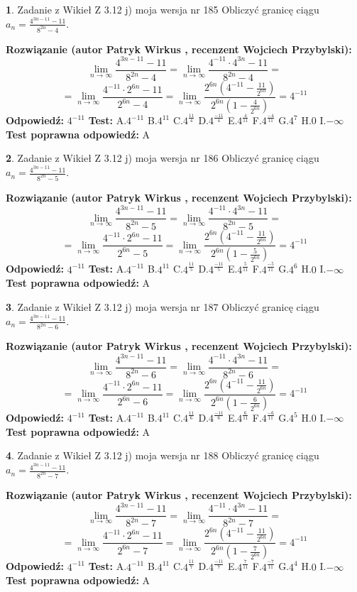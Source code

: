 \documentclass[12pt, a4paper]{article}
\theoremstyle{definition} %
\newtheorem{zad}{}
\newcommand{\zadStart}[1]{\begin{zad}#1\newline}
\newcommand{\zadStop}{\end{zad}}
\newcommand{\rozwStart}[2]{\noindent \textbf{Rozwiązanie (autor #1 , recenzent #2): }\newline}
\newcommand{\rozwStop}{\newline}
\newcommand{\odpStart}{\noindent \textbf{Odpowiedź:}\newline}
\newcommand{\odpStop}{\newline}
\newcommand{\testStart}{\noindent \textbf{Test:}\newline}
\newcommand{\testStop}{\newline}
\newcommand{\kluczStart}{\noindent \textbf{Test poprawna odpowiedź:}\newline}
\newcommand{\kluczStop}{\newline}
\begin{document}
\zadStart{Zadanie z Wikieł Z 3.12 j) moja wersja nr 185}
Obliczyć granicę ciągu $a_{n}=\frac{4^{3n-11}-11}{8^{2n}-4}$.
\zadStop
\rozwStart{Patryk Wirkus}{Wojciech Przybylski}
$$\lim\limits_{n\to\infty}\frac{4^{3n-11}-11}{8^{2n}-4}= \lim\limits_{n\to\infty}\frac{4^{-11} \cdot 4^{3n}-11}{8^{2n}-4}=$$
$$= \lim\limits_{n\to\infty}\frac{4^{-11} \cdot 2^{6n}-11}{2^{6n}-4}= \lim\limits_{n\to\infty}\frac{2^{6n}(4^{-11} - \frac{11}{2^{6n}})}{2^{6n}(1-\frac{4}{2^{6n}})}= 4^{-11}$$
\rozwStop
\odpStart
$4^{-11}$
\odpStop
\testStart
A.$4^{-11}$
B.$4^{11}$
C.$4^{\frac{11}{4}}$
D.$4^{\frac{-11}{4}}$
E.$4^{\frac{4}{11}}$
F.$4^{\frac{-4}{11}}$
G.$4^{7}$
H.$0$
I.$-\infty$
\testStop
\kluczStart
A
\kluczStop



\zadStart{Zadanie z Wikieł Z 3.12 j) moja wersja nr 186}
Obliczyć granicę ciągu $a_{n}=\frac{4^{3n-11}-11}{8^{2n}-5}$.
\zadStop
\rozwStart{Patryk Wirkus}{Wojciech Przybylski}
$$\lim\limits_{n\to\infty}\frac{4^{3n-11}-11}{8^{2n}-5}= \lim\limits_{n\to\infty}\frac{4^{-11} \cdot 4^{3n}-11}{8^{2n}-5}=$$
$$= \lim\limits_{n\to\infty}\frac{4^{-11} \cdot 2^{6n}-11}{2^{6n}-5}= \lim\limits_{n\to\infty}\frac{2^{6n}(4^{-11} - \frac{11}{2^{6n}})}{2^{6n}(1-\frac{5}{2^{6n}})}= 4^{-11}$$
\rozwStop
\odpStart
$4^{-11}$
\odpStop
\testStart
A.$4^{-11}$
B.$4^{11}$
C.$4^{\frac{11}{5}}$
D.$4^{\frac{-11}{5}}$
E.$4^{\frac{5}{11}}$
F.$4^{\frac{-5}{11}}$
G.$4^{6}$
H.$0$
I.$-\infty$
\testStop
\kluczStart
A
\kluczStop



\zadStart{Zadanie z Wikieł Z 3.12 j) moja wersja nr 187}
Obliczyć granicę ciągu $a_{n}=\frac{4^{3n-11}-11}{8^{2n}-6}$.
\zadStop
\rozwStart{Patryk Wirkus}{Wojciech Przybylski}
$$\lim\limits_{n\to\infty}\frac{4^{3n-11}-11}{8^{2n}-6}= \lim\limits_{n\to\infty}\frac{4^{-11} \cdot 4^{3n}-11}{8^{2n}-6}=$$
$$= \lim\limits_{n\to\infty}\frac{4^{-11} \cdot 2^{6n}-11}{2^{6n}-6}= \lim\limits_{n\to\infty}\frac{2^{6n}(4^{-11} - \frac{11}{2^{6n}})}{2^{6n}(1-\frac{6}{2^{6n}})}= 4^{-11}$$
\rozwStop
\odpStart
$4^{-11}$
\odpStop
\testStart
A.$4^{-11}$
B.$4^{11}$
C.$4^{\frac{11}{6}}$
D.$4^{\frac{-11}{6}}$
E.$4^{\frac{6}{11}}$
F.$4^{\frac{-6}{11}}$
G.$4^{5}$
H.$0$
I.$-\infty$
\testStop
\kluczStart
A
\kluczStop



\zadStart{Zadanie z Wikieł Z 3.12 j) moja wersja nr 188}
Obliczyć granicę ciągu $a_{n}=\frac{4^{3n-11}-11}{8^{2n}-7}$.
\zadStop
\rozwStart{Patryk Wirkus}{Wojciech Przybylski}
$$\lim\limits_{n\to\infty}\frac{4^{3n-11}-11}{8^{2n}-7}= \lim\limits_{n\to\infty}\frac{4^{-11} \cdot 4^{3n}-11}{8^{2n}-7}=$$
$$= \lim\limits_{n\to\infty}\frac{4^{-11} \cdot 2^{6n}-11}{2^{6n}-7}= \lim\limits_{n\to\infty}\frac{2^{6n}(4^{-11} - \frac{11}{2^{6n}})}{2^{6n}(1-\frac{7}{2^{6n}})}= 4^{-11}$$
\rozwStop
\odpStart
$4^{-11}$
\odpStop
\testStart
A.$4^{-11}$
B.$4^{11}$
C.$4^{\frac{11}{7}}$
D.$4^{\frac{-11}{7}}$
E.$4^{\frac{7}{11}}$
F.$4^{\frac{-7}{11}}$
G.$4^{4}$
H.$0$
I.$-\infty$
\testStop
\kluczStart
A
\kluczStop
\end{document}
